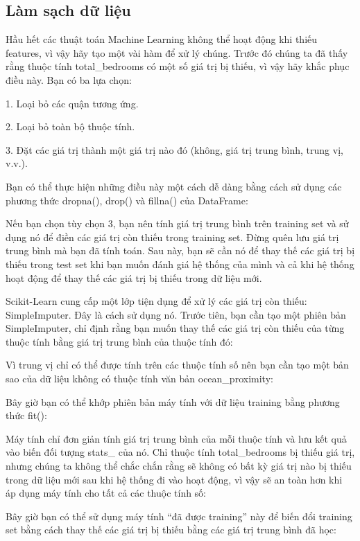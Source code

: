 \subsection{Làm sạch dữ liệu}

Hầu hết các thuật toán Machine Learning không thể hoạt động khi thiếu features, vì vậy hãy tạo một vài hàm để xử lý chúng. Trước đó chúng ta đã thấy rằng thuộc tính total\_bedrooms có một số giá trị bị thiếu, vì vậy hãy khắc phục điều này. Bạn có ba lựa chọn:

1. Loại bỏ các quận tương ứng.

2. Loại bỏ toàn bộ thuộc tính.

3. Đặt các giá trị thành một giá trị nào đó (không, giá trị trung bình, trung vị, v.v.).

Bạn có thể thực hiện những điều này một cách dễ dàng bằng cách sử dụng các phương thức dropna(), drop() và fillna() của DataFrame:

Nếu bạn chọn tùy chọn 3, bạn nên tính giá trị trung bình trên training set và sử dụng nó để điền các giá trị còn thiếu trong training set. Đừng quên lưu giá trị trung bình mà bạn đã tính toán. Sau này, bạn sẽ cần nó để thay thế các giá trị bị thiếu trong test set khi bạn muốn đánh giá hệ thống của mình và cả khi hệ thống hoạt động để thay thế các giá trị bị thiếu trong dữ liệu mới.

Scikit-Learn cung cấp một lớp tiện dụng để xử lý các giá trị còn thiếu: SimpleImputer. Đây là cách sử dụng nó. Trước tiên, bạn cần tạo một phiên bản SimpleImputer, chỉ định rằng bạn muốn thay thế các giá trị còn thiếu của từng thuộc tính bằng giá trị trung bình của thuộc tính đó:

Vì trung vị chỉ có thể được tính trên các thuộc tính số nên bạn cần tạo một bản sao của dữ liệu không có thuộc tính văn bản ocean\_proximity:

Bây giờ bạn có thể khớp phiên bản máy tính với dữ liệu training bằng phương thức fit():

Máy tính chỉ đơn giản tính giá trị trung bình của mỗi thuộc tính và lưu kết quả vào biến đối tượng stats\_ của nó. Chỉ thuộc tính total\_bedrooms bị thiếu giá trị, nhưng chúng ta không thể chắc chắn rằng sẽ không có bất kỳ giá trị nào bị thiếu trong dữ liệu mới sau khi hệ thống đi vào hoạt động, vì vậy sẽ an toàn hơn khi áp dụng máy tính cho tất cả các thuộc tính số:

Bây giờ bạn có thể sử dụng máy tính “đã được training” này để biến đổi training set bằng cách thay thế các giá trị bị thiếu bằng các giá trị trung bình đã học:

